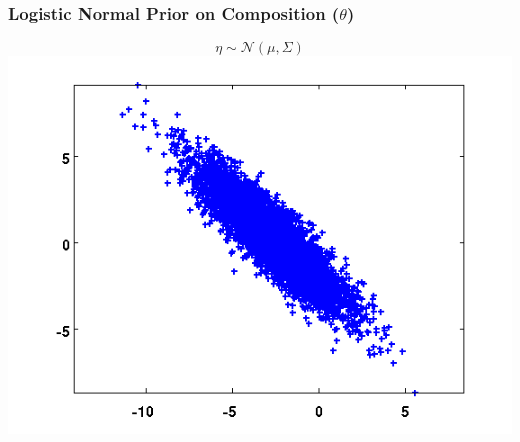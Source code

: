 \begin{frame}
  \frametitle{Logistic Normal Prior on Composition ($\theta$)}
  \begin{center}
    \vspace{-0.4in}
    \begin{equation*}
      \eta \sim \mathcal{N}(\mu, \Sigma)
    \end{equation*}
    \includegraphics[scale=0.6]{img/log-normal-figs/normal-2.png}
  \end{center}
\end{frame}

%
%
%
%
